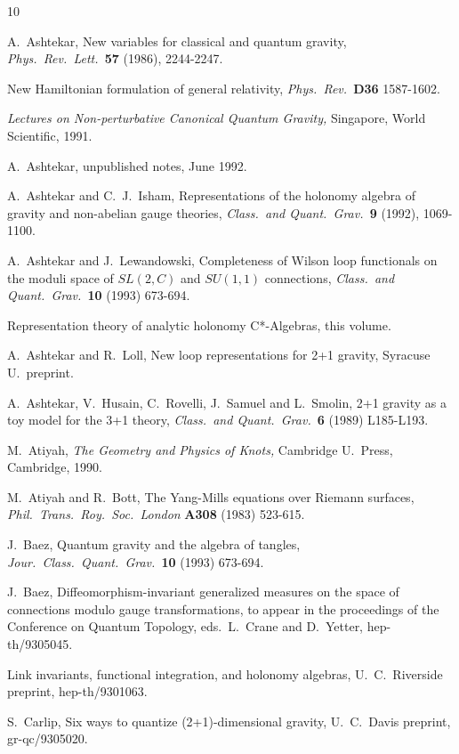 \documentclass[12pt]{article}
\begin{document}
\begin{thebibliography} {10}

 A.\ Ashtekar, New variables for classical and quantum gravity,
{\sl Phys.\ Rev.\ Lett.\ }{\bf 57} (1986), 2244-2247.

New Hamiltonian formulation of general
relativity, {\sl Phys.\ Rev.\ }{\bf D36} 1587-1602.

{\sl Lectures on Non-perturbative Canonical Quantum
Gravity,} Singapore, World Scientific, 1991.

  A.\ Ashtekar, unpublished notes, June 1992.

A.\ Ashtekar and C.\ J.\ Isham, Representations of the holonomy
algebra of gravity and non-abelian gauge theories, {\sl Class.\ and
Quant.\ Grav.\ }{\bf 9} (1992), 1069-1100.

A.\  Ashtekar and J.\ Lewandowski, Completeness of Wilson loop
functionals on the moduli space of $SL(2,C)$ and $SU(1,1)$
connections, {\sl Class.\ and Quant.\ Grav.\ }{\bf 10} (1993) 673-694.

Representation theory of analytic holonomy C*-Algebras,
this volume.

 A.\ Ashtekar and R.\ Loll, New loop representations
for 2+1 gravity, Syracuse U.\ preprint.

 A.\ Ashtekar, V.\ Husain, C.\ Rovelli, J.\ Samuel and
L.\ Smolin, 2+1 gravity as a toy model for the 3+1 theory, {\sl Class.\
and Quant.\ Grav.\ }{\bf 6} (1989) L185-L193.

 M.\ Atiyah, {\sl The Geometry and Physics of Knots,}
Cambridge U.\ Press, Cambridge, 1990.

 M.\ Atiyah and R.\ Bott, The Yang-Mills equations over
Riemann surfaces, {\sl Phil.\ Trans.\ Roy.\ Soc.\ London} {\bf A308}
(1983) 523-615.

 J.\ Baez, Quantum gravity and the algebra of
tangles, {\sl Jour.\ Class.\ Quant.\ Grav.\ }{\bf 10} (1993) 673-694.

  J.\ Baez, Diffeomorphism-invariant generalized measures
on the space of connections modulo gauge transformations,
to appear in the proceedings of the Conference on Quantum
Topology, eds.\ L.\ Crane and D.\ Yetter, hep-th/9305045.

Link invariants, functional integration, and holonomy algebras,
U.\ C.\ Riverside preprint, hep-th/9301063.

 S.\ Carlip, Six ways to quantize (2+1)-dimensional
gravity, U.\ C.\ Davis preprint, gr-qc/9305020.


\end{thebibliography}
\end{document}
